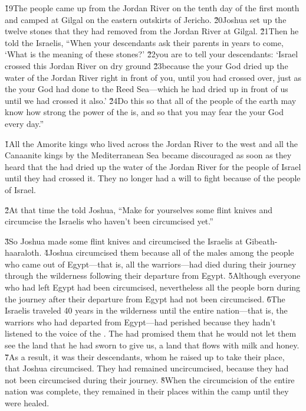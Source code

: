 \v{19}The people came up from the Jordan River on the tenth day of the first month and camped at Gilgal on the eastern outskirts of Jericho. \v{20}Joshua set up the twelve stones that they had removed from the Jordan River at Gilgal. \v{21}Then he told the Israelis, ``When your descendants ask their parents in years to come, `What is the meaning of these stones?' \v{22}you are to tell your descendants: `Israel crossed this Jordan River on dry ground \v{23}because the  your God dried up the water of the Jordan River right in front of you, until you had crossed over, just as the  your God had done to the Reed Sea---which he had dried up in front of us until we had crossed it also.' \v{24}Do this so that all of the people of the earth may know how strong the power of the  is, and so that you may fear the  your God every day.''

\v{1}All the Amorite kings who lived across the Jordan River to the west and all the Canaanite kings by the Mediterranean Sea became discouraged as soon as they heard that the  had dried up the water of the Jordan River for the people of Israel until they had crossed it. They no longer had a will to fight because of the people of Israel.

\v{2}At that time the  told Joshua, ``Make for yourselves some flint knives and circumcise the Israelis who haven't been circumcised yet.''

\v{3}So Joshua made some flint knives and circumcised the Israelis at Gibeath-haaraloth. \v{4}Joshua circumcised them because all of the males among the people who came out of Egypt---that is, all the warriors---had died during their journey through the wilderness following their departure from Egypt. \v{5}Although everyone who had left Egypt had been circumcised, nevertheless all the people born during the journey after their departure from Egypt had not been circumcised. \v{6}The Israelis traveled 40 years in the wilderness until the entire nation---that is, the warriors who had departed from Egypt---had perished because they hadn't listened to the voice of the . The  had promised them that he would not let them see the land that he had sworn to give us, a land that flows with milk and honey. \v{7}As a result, it was their descendants, whom he raised up to take their place, that Joshua circumcised. They had remained uncircumcised, because they had not been circumcised during their journey. \v{8}When the circumcision of the entire nation was complete, they remained in their places within the camp until they were healed.

